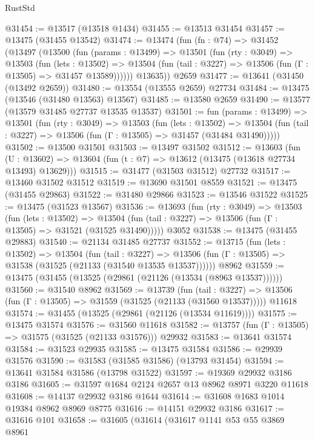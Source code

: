 \begin{lexlean}{RustStd}
\begin{coremodule}
@31454 := @13517 (@13518 @1434)
@31455 := @13513 @31454
@31457 := @13475 (@31455 @13542)
@31474 := @13474
    (fun (fn : @74) =>
    @31452
      (@13497
        (@13500
          (fun (params : @13499) =>
          @13501
            (fun (rty : @3049) =>
            @13503
              (fun (lets : @13502) =>
              @13504 (fun (tail : @3227) => @13506 (fun (Γ : @13505) => @31457 @13589))))))
        @13635))
    @2659
@31477 := @13641 (@31450 (@13492 @2659))
@31480 := @13554 (@13555 @2659) @27734
@31484 := @13475 (@13546 (@31480 @13563) @13567)
@31485 := @13580 @2659
@31490 := @13577 (@13579 @31485 @27737 @13535 @13537)
@31501 := fun (params : @13499) =>
  @13501
    (fun (rty : @3049) =>
    @13503
      (fun (lets : @13502) =>
      @13504 (fun (tail : @3227) => @13506 (fun (Γ : @13505) => @31457 (@31484 @31490)))))
@31502 := @13500 @31501
@31503 := @13497 @31502
@31512 := @13603
    (fun (U : @13602) => @13604 (fun (t : @7) => @13612 (@13475 (@13618 @27734 @13493) @13629)))
@31515 := @31477 (@31503 @31512) @27732
@31517 := @13460 @31502 @31512
@31519 := @13690 @31501 @8559
@31521 := @13475 (@31455 @29863)
@31522 := @31480 @29866
@31523 := @13546 @31522
@31525 := @13475 (@31523 @13567)
@31536 := @13693
    (fun (rty : @3049) =>
    @13503
      (fun (lets : @13502) =>
      @13504 (fun (tail : @3227) => @13506 (fun (Γ : @13505) => @31521 (@31525 @31490)))))
    @3052
@31538 := @13475 (@31455 @29883)
@31540 := @21134 @31485 @27737
@31552 := @13715
    (fun (lets : @13502) =>
    @13504
      (fun (tail : @3227) =>
      @13506 (fun (Γ : @13505) => @31538 (@31525 (@21133 (@31540 @13535 @13537))))))
    @8962
@31559 := @13475 (@31455 (@13525 (@29861 (@21126 (@13534 (@8963 @13537))))))
@31560 := @31540 @8962
@31569 := @13739
    (fun (tail : @3227) => @13506 (fun (Γ : @13505) => @31559 (@31525 (@21133 (@31560 @13537)))))
    @11618
@31574 := @31455 (@13525 (@29861 (@21126 (@13534 @11619))))
@31575 := @13475 @31574
@31576 := @31560 @11618
@31582 := @13757 (fun (Γ : @13505) => @31575 (@31525 (@21133 @31576))) @29932
@31583 := @13641 @31574
@31584 := @31523 @29935
@31585 := @13475 @31584
@31586 := @29939 @31576
@31590 := @31583 (@31585 @31586) (@13793 @31454)
@31594 := @13641 @31584 @31586 (@13798 @31522)
@31597 := @19369 @29932 @3186 @3186
@31605 := @31597 @1684 @2124 @2657 @13 @8962 @8971 @3220 @11618
@31608 := @14137 @29932 @3186 @1644
@31614 := @31608 @1683 @1014 @19384 @8962 @8969 @8775
@31616 := @14151 @29932 @3186
@31617 := @31616 @101
@31658 := @31605
    (@31614
      (@31617
        @1141
        @53
        @55
        @3869
        @8961

\end{coremodule}
\end{lexlean}
